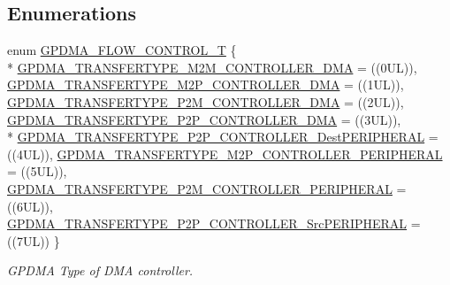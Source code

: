 \subsection*{Enumerations}
\begin{DoxyCompactItemize}
\item 
enum \hyperlink{group__GPDMA__17XX__40XX_ga2cb59b641cd840f22780c44be1208133}{G\+P\+D\+M\+A\+\_\+\+F\+L\+O\+W\+\_\+\+C\+O\+N\+T\+R\+O\+L\+\_\+T} \{ \\*
\hyperlink{group__GPDMA__17XX__40XX_gga2cb59b641cd840f22780c44be1208133ae5ff87adb4451f2a695c9d21c3c52c59}{G\+P\+D\+M\+A\+\_\+\+T\+R\+A\+N\+S\+F\+E\+R\+T\+Y\+P\+E\+\_\+\+M2\+M\+\_\+\+C\+O\+N\+T\+R\+O\+L\+L\+E\+R\+\_\+\+D\+MA} = ((0\+UL)), 
\hyperlink{group__GPDMA__17XX__40XX_gga2cb59b641cd840f22780c44be1208133a331474560497f41cfe921b0e55ce8722}{G\+P\+D\+M\+A\+\_\+\+T\+R\+A\+N\+S\+F\+E\+R\+T\+Y\+P\+E\+\_\+\+M2\+P\+\_\+\+C\+O\+N\+T\+R\+O\+L\+L\+E\+R\+\_\+\+D\+MA} = ((1\+UL)), 
\hyperlink{group__GPDMA__17XX__40XX_gga2cb59b641cd840f22780c44be1208133aa2ae587fb924cb679f51250470927e34}{G\+P\+D\+M\+A\+\_\+\+T\+R\+A\+N\+S\+F\+E\+R\+T\+Y\+P\+E\+\_\+\+P2\+M\+\_\+\+C\+O\+N\+T\+R\+O\+L\+L\+E\+R\+\_\+\+D\+MA} = ((2\+UL)), 
\hyperlink{group__GPDMA__17XX__40XX_gga2cb59b641cd840f22780c44be1208133a29ec59e967f3a1841002ef740552c1d5}{G\+P\+D\+M\+A\+\_\+\+T\+R\+A\+N\+S\+F\+E\+R\+T\+Y\+P\+E\+\_\+\+P2\+P\+\_\+\+C\+O\+N\+T\+R\+O\+L\+L\+E\+R\+\_\+\+D\+MA} = ((3\+UL)), 
\\*
\hyperlink{group__GPDMA__17XX__40XX_gga2cb59b641cd840f22780c44be1208133a176e307292918213de220bdae957ad6d}{G\+P\+D\+M\+A\+\_\+\+T\+R\+A\+N\+S\+F\+E\+R\+T\+Y\+P\+E\+\_\+\+P2\+P\+\_\+\+C\+O\+N\+T\+R\+O\+L\+L\+E\+R\+\_\+\+Dest\+P\+E\+R\+I\+P\+H\+E\+R\+AL} = ((4\+UL)), 
\hyperlink{group__GPDMA__17XX__40XX_gga2cb59b641cd840f22780c44be1208133a640177df7a3c696a9ccab9a09dcdbc0c}{G\+P\+D\+M\+A\+\_\+\+T\+R\+A\+N\+S\+F\+E\+R\+T\+Y\+P\+E\+\_\+\+M2\+P\+\_\+\+C\+O\+N\+T\+R\+O\+L\+L\+E\+R\+\_\+\+P\+E\+R\+I\+P\+H\+E\+R\+AL} = ((5\+UL)), 
\hyperlink{group__GPDMA__17XX__40XX_gga2cb59b641cd840f22780c44be1208133aaeaf72b20cee326722ee7650405e2e43}{G\+P\+D\+M\+A\+\_\+\+T\+R\+A\+N\+S\+F\+E\+R\+T\+Y\+P\+E\+\_\+\+P2\+M\+\_\+\+C\+O\+N\+T\+R\+O\+L\+L\+E\+R\+\_\+\+P\+E\+R\+I\+P\+H\+E\+R\+AL} = ((6\+UL)), 
\hyperlink{group__GPDMA__17XX__40XX_gga2cb59b641cd840f22780c44be1208133a4615bdb6a415ddc02f8eab20a700a17d}{G\+P\+D\+M\+A\+\_\+\+T\+R\+A\+N\+S\+F\+E\+R\+T\+Y\+P\+E\+\_\+\+P2\+P\+\_\+\+C\+O\+N\+T\+R\+O\+L\+L\+E\+R\+\_\+\+Src\+P\+E\+R\+I\+P\+H\+E\+R\+AL} = ((7\+UL))
 \}\begin{DoxyCompactList}\small\item\em G\+P\+D\+MA Type of D\+MA controller. \end{DoxyCompactList}

\end{DoxyCompactItemize}
